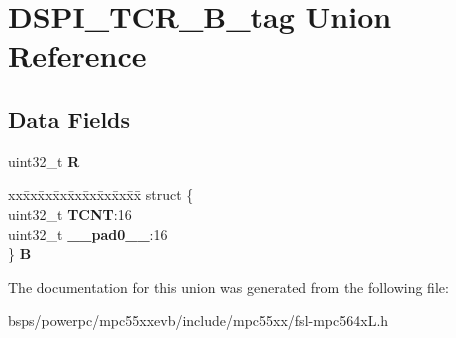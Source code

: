\hypertarget{unionDSPI__TCR__32B__tag}{}\section{D\+S\+P\+I\+\_\+\+T\+C\+R\+\_\+B\+\_\+tag Union Reference}
\label{unionDSPI__TCR__32B__tag}
\subsection*{Data Fields}
\begin{DoxyCompactItemize}
\item 
\mbox{\label{unionDSPI__TCR__32B__tag_a93e46fdffb4ac0b4238eab8b497ec13a}} 
uint32\+\_\+t {\bfseries R}
\item 
\mbox{\label{unionDSPI__TCR__32B__tag_a1b4189028745af0ebec3df2141f9408e}} 
\begin{tabbing}
xx\=xx\=xx\=xx\=xx\=xx\=xx\=xx\=xx\=\kill
struct \{\\
\>uint32\_t {\bfseries TCNT}:16\\
\>uint32\_t {\bfseries \_\_pad0\_\_}:16\\
\} {\bfseries B}\\

\end{tabbing}\end{DoxyCompactItemize}


The documentation for this union was generated from the following file\+:\begin{DoxyCompactItemize}
\item 
bsps/powerpc/mpc55xxevb/include/mpc55xx/fsl-\/mpc564x\+L.\+h\end{DoxyCompactItemize}
